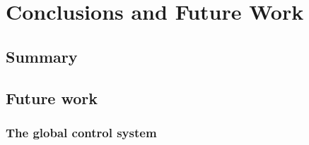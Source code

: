 \chapter{Conclusions and Future Work}
\label{chap:conclusion}
\chaptoc{}


\newpage
\section{Summary}
\label{sec:summary}
\begin{colsection}


\begin{colsection}


\end{colsection}


\end{colsection}


\newpage
\section{Future work}
\label{sec:future}
\begin{colsection}


\begin{colsection}

\citep{GW150914, GW150914_followup, GW151226}

\end{colsection}


\subsection{The global control system}
\label{sec:gtecs_multisite}
\begin{colsection}


\end{colsection}


\end{colsection}

